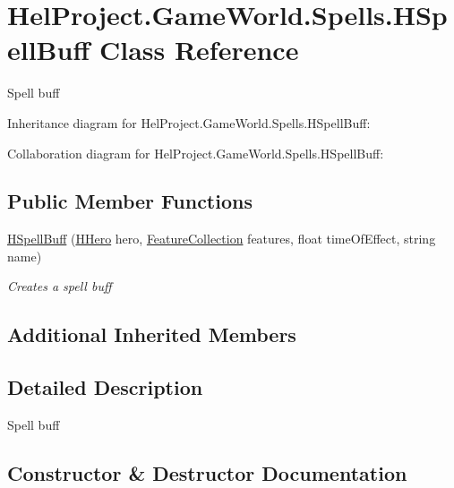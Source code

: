 \hypertarget{class_hel_project_1_1_game_world_1_1_spells_1_1_h_spell_buff}{}\section{Hel\+Project.\+Game\+World.\+Spells.\+H\+Spell\+Buff Class Reference}
\label{class_hel_project_1_1_game_world_1_1_spells_1_1_h_spell_buff}


Spell buff  




Inheritance diagram for Hel\+Project.\+Game\+World.\+Spells.\+H\+Spell\+Buff\+:


Collaboration diagram for Hel\+Project.\+Game\+World.\+Spells.\+H\+Spell\+Buff\+:
\subsection*{Public Member Functions}
\begin{DoxyCompactItemize}
\item 
\hyperlink{class_hel_project_1_1_game_world_1_1_spells_1_1_h_spell_buff_ad751033489b43b527b0f1c4bacf166b4}{H\+Spell\+Buff} (\hyperlink{class_hel_project_1_1_game_world_1_1_entities_1_1_h_hero}{H\+Hero} hero, \hyperlink{class_hel_project_1_1_features_1_1_feature_collection}{Feature\+Collection} features, float time\+Of\+Effect, string name)
\begin{DoxyCompactList}\small\item\em Creates a spell buff \end{DoxyCompactList}\end{DoxyCompactItemize}
\subsection*{Additional Inherited Members}


\subsection{Detailed Description}
Spell buff 



\subsection{Constructor \& Destructor Documentation}
\hypertarget{class_hel_project_1_1_game_world_1_1_spells_1_1_h_spell_buff_ad751033489b43b527b0f1c4bacf166b4}{}
